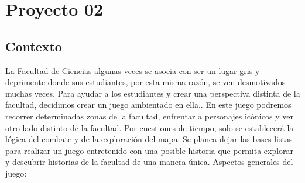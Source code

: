 \documentclass{article}
\begin{document}

\section*{\LARGE{Proyecto 02}}

\subsection*{Contexto}
La Facultad de Ciencias algunas veces se asocia con ser un lugar gris y deprimente donde sus estudiantes, por esta misma razón, se ven desmotivados muchas veces.
Para ayudar a los estudiantes y crear una perspectiva distinta de la facultad, decidimos crear un juego ambientado en ella.. 
En este juego podremos recorrer determinadas zonas de la facultad, enfrentar a personajes icónicos y ver otro lado distinto de la facultad.
Por cuestiones de tiempo, solo se establecerá la lógica del combate y de la exploración del mapa. Se planea dejar las bases listas para realizar un juego entretenido con una posible historia que permita explorar y descubrir historias de la facultad de una manera única.
Aspectos generales del juego:
\end{document}
